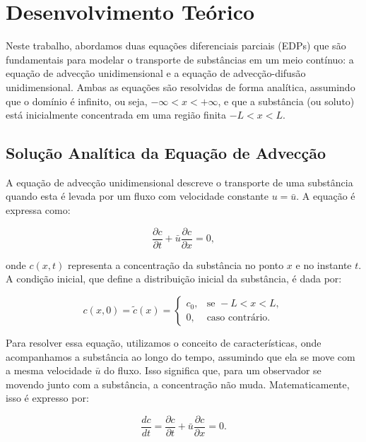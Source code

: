 \section{Desenvolvimento Teórico}

Neste trabalho, abordamos duas equações diferenciais parciais (EDPs) que são fundamentais para modelar o transporte de substâncias em um meio contínuo: a equação de advecção unidimensional e a equação de advecção-difusão unidimensional. Ambas as equações são resolvidas de forma analítica, assumindo que o domínio é infinito, ou seja, \( -\infty < x < +\infty \), e que a substância (ou soluto) está inicialmente concentrada em uma região finita \( -L < x < L \).

\subsection{Solução Analítica da Equação de Advecção}

A equação de advecção unidimensional descreve o transporte de uma substância quando esta é levada por um fluxo com velocidade constante \( u = \bar{u} \). A equação é expressa como:

\begin{equation}
    \frac{\partial c}{\partial t} + \bar{u} \frac{\partial c}{\partial x} = 0,
\end{equation}

onde \( c(x,t) \) representa a concentração da substância no ponto \( x \) e no instante \( t \). A condição inicial, que define a distribuição inicial da substância, é dada por:

\begin{equation}
    c(x, 0) = \tilde{c}(x) = \begin{cases}
        c_0, & \text{se } -L < x < L, \\
        0,   & \text{caso contrário}.
    \end{cases}
\end{equation}

Para resolver essa equação, utilizamos o conceito de características, onde acompanhamos a substância ao longo do tempo, assumindo que ela se move com a mesma velocidade \( \bar{u} \) do fluxo. Isso significa que, para um observador se movendo junto com a substância, a concentração não muda. Matematicamente, isso é expresso por:

\begin{equation}
    \frac{d c}{d t} = \frac{\partial c}{\partial t} + \bar{u} \frac{\partial c}{\partial x} = 0.
\end{equation}

